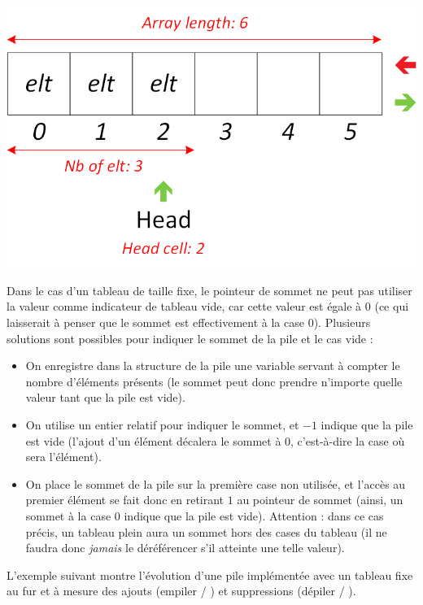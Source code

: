 \begin{center}
\includegraphics[scale=1]{Cours/Piles_5_Tableau_Statique_Structure_Detaillee.png}
\end{center}

\smallskip

Dans le cas d'un tableau de taille fixe, le pointeur de sommet ne peut pas utiliser la valeur  comme indicateur de tableau vide, car cette valeur est égale à $ 0 $ (ce qui laisserait à penser que le sommet est effectivement à la case 0).
Plusieurs solutions sont possibles pour indiquer le sommet de la pile et le cas vide :

\begin{itemize}
\item On enregistre dans la structure de la pile une variable servant à compter le nombre d'éléments présents (le sommet peut donc prendre n'importe quelle valeur tant que la pile est vide).
\item On utilise un entier relatif pour indiquer le sommet, et $ -1 $ indique que la pile est vide (l'ajout d'un élément décalera le sommet à $ 0 $, c'est-à-dire la case où sera l'élément).
\item On place le sommet de la pile sur la première case non utilisée, et l'accès au premier élément se fait donc en retirant $ 1 $ au pointeur de sommet (ainsi, un sommet à la case $ 0 $ indique que la pile est vide).
Attention : dans ce cas précis, un tableau plein aura un sommet hors des cases du tableau (il ne faudra donc \textit{jamais} le déréférencer s'il atteinte une telle valeur).
\end{itemize}

\smallskip

L'exemple suivant montre l'évolution d'une pile implémentée avec un tableau fixe au fur et à mesure des ajouts (empiler / ) et suppressions (dépiler / ).\\

